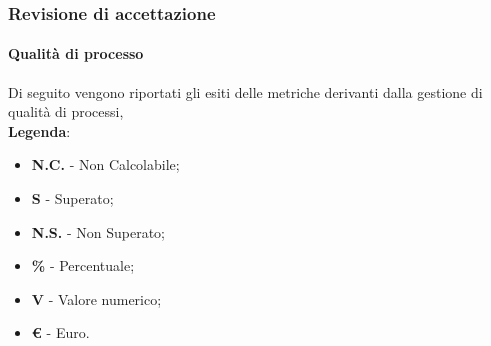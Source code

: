 	\subsubsection{Revisione di accettazione}
	\paragraph{Qualità di processo}
		Di seguito vengono riportati gli esiti delle metriche derivanti dalla gestione di qualità di processi, \\
\textbf{Legenda}:
\begin{itemize}
	\item \textbf{N.C.} - Non Calcolabile;
	\item \textbf{S} - Superato;
	\item \textbf{N.S.} - Non Superato;
	\item \textbf{\%} - Percentuale;
	\item \textbf{V} - Valore numerico;
	\item \textbf{\euro{}} - Euro.
\end{itemize}

